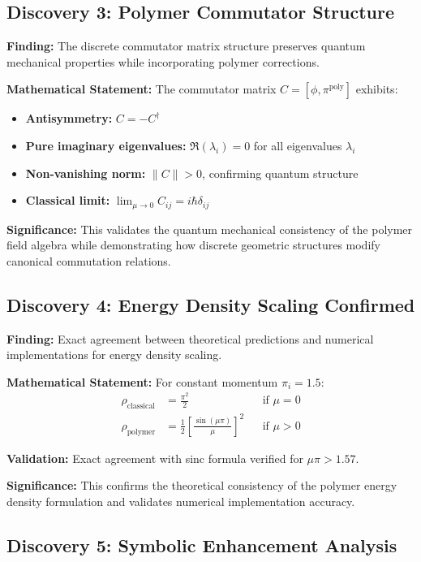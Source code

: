 \documentclass[11pt]{article}
\begin{document}
\subsection{Discovery 3: Polymer Commutator Structure}

\textbf{Finding:} The discrete commutator matrix structure preserves quantum mechanical properties while incorporating polymer corrections.

\textbf{Mathematical Statement:}
The commutator matrix $C = [\phi, \pi^{\text{poly}}]$ exhibits:
\begin{itemize}
    \item \textbf{Antisymmetry:} $C = -C^\dagger$
    \item \textbf{Pure imaginary eigenvalues:} $\Re(\lambda_i) = 0$ for all eigenvalues $\lambda_i$
    \item \textbf{Non-vanishing norm:} $\|C\| > 0$, confirming quantum structure
    \item \textbf{Classical limit:} $\lim_{\mu \to 0} C_{ij} = i\hbar\delta_{ij}$
\end{itemize}

\textbf{Significance:} This validates the quantum mechanical consistency of the polymer field algebra while demonstrating how discrete geometric structures modify canonical commutation relations.

\subsection{Discovery 4: Energy Density Scaling Confirmed}

\textbf{Finding:} Exact agreement between theoretical predictions and numerical implementations for energy density scaling.

\textbf{Mathematical Statement:}
For constant momentum $\pi_i = 1.5$:
\begin{align}
\rho_{\text{classical}} &= \frac{\pi^2}{2} && \text{if } \mu = 0 \\
\rho_{\text{polymer}} &= \frac{1}{2}\left[\frac{\sin(\mu\pi)}{\mu}\right]^2 && \text{if } \mu > 0
\end{align}

\textbf{Validation:} Exact agreement with sinc formula verified for $\mu\pi > 1.57$.

\textbf{Significance:} This confirms the theoretical consistency of the polymer energy density formulation and validates numerical implementation accuracy.

\subsection{Discovery 5: Symbolic Enhancement Analysis}
\end{document}
